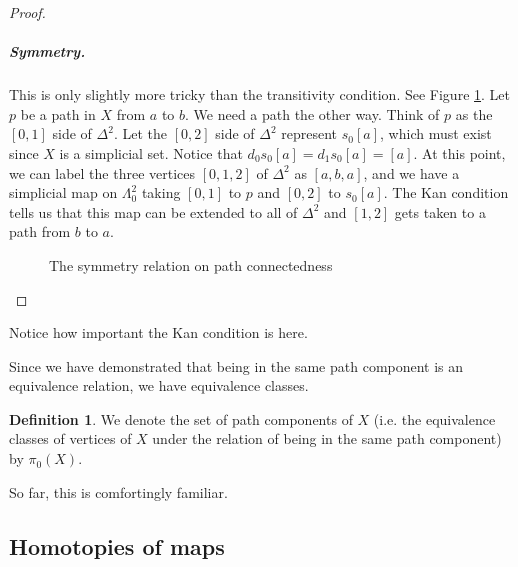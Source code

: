 \documentclass[12pt]{article}
\theoremstyle{plain}
\theoremstyle{definition}
\newtheorem{definition}[theorem]{Definition}
\theoremstyle{remark}
\begin{document}
\begin{proof}
\subparagraph{Symmetry.} This is only slightly more tricky than the transitivity condition.  See Figure \ref{F: fig20b}. Let $p$ be a path in $X$ from $a$ to $b$. We need a path the other way. Think of $p$ as the $[0,1]$ side of $\Delta^2$. Let the $[0,2]$ side of $\Delta^2$ represent $s_0[a]$, which must exist since $X$ is a simplicial set. Notice that $d_0s_0[a]=d_1s_0[a]=[a]$. At this point, we can label the three vertices $[0,1,2]$ of $\Delta^2$ as $[a,b,a]$, and we have a simplicial map on $\Lambda^2_0$ taking $[0,1]$ to $p$ and $[0,2]$ to $s_0[a]$. The Kan condition tells us that this map can be extended to all of $\Delta^2$ and $[1,2]$ gets taken to a path from $b$ to $a$. 
\begin{figure}[!htp]
\begin{center}
\end{center}
\caption{The symmetry relation on path connectedness}\label{F: fig20b}
\end{figure}
\end{proof}

Notice how important the Kan condition is here. 

Since we have demonstrated that being in the same path component is an equivalence relation, we have equivalence classes.

\begin{definition}
We denote the set of path components of $X$ (i.e. the equivalence classes of vertices of $X$ under the relation of being in the same path component) by  $\pi_0(X)$.
\end{definition}


So far, this is comfortingly familiar.







\subsection{Homotopies of maps}\label{S: homotopy}
\end{document}
